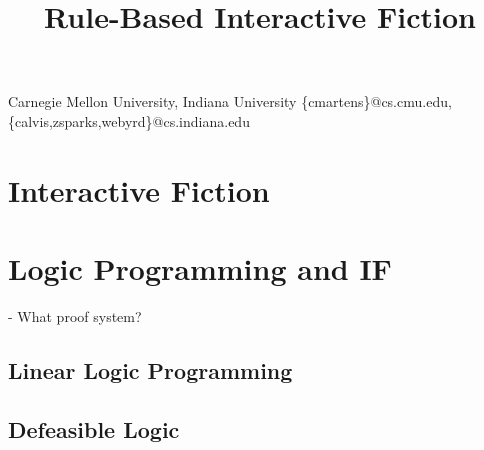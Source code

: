 \documentclass[computermodern]{sigplanconf}
\begin{document}


\title{Rule-Based Interactive Fiction}


           {Carnegie Mellon University, Indiana University}
           {\{cmartens\}@cs.cmu.edu,\{calvis,zsparks,webyrd\}@cs.indiana.edu}

\maketitle

\section{Interactive Fiction}



\section{Logic Programming and IF}



- What proof system?

\subsection{Linear Logic Programming}

\subsection{Defeasible Logic}

\nocite{Covington:1996:PPD:230996}
\nocite{apt03principles}
\nocite{Marriottp98Pwc}

%


\end{document}
